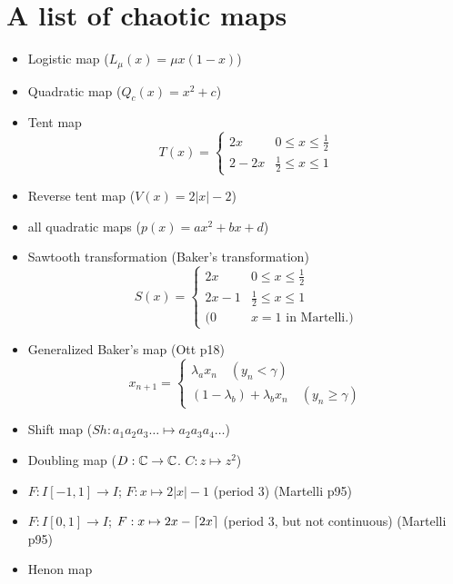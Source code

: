 \documentclass[11pt]{book}
\begin{document}
\section{A list of chaotic maps}
\begin{itemize}
  \item Logistic map ($L_\mu(x) = \mu x(1-x)$)
  \item Quadratic map ($Q_c(x) = x^2 + c$)
  \item Tent map 
    \begin{equation*}
      T(x) = 
      \begin{cases}
        2x & 0 \leq x \leq \frac{1}{2}      \\
        2 - 2x & \frac{1}{2} \leq x \leq 1
      \end{cases}
    \end{equation*}
  \item Reverse tent map ($V(x) = 2|x| - 2$)
  \item all quadratic maps ($p(x) = ax^2 + bx + d$)
  \item Sawtooth transformation (Baker's transformation)
    \begin{equation*}
      S(x) = 
      \begin{cases}
        2x     & 0 \leq x \leq \frac{1}{2}      \\
        2x - 1 & \frac{1}{2} \leq x \leq 1      \\
        (0 & x = 1 \mbox{ in Martelli.})
      \end{cases}
    \end{equation*}
  \item Generalized Baker's map (Ott p18)
    \begin{equation*}
      x_{n+1} = 
      \begin{cases}
        \lambda_a x_n \quad   (y_n < \gamma) \\
        (1 - \lambda_b) + \lambda_b x_n \quad   (y_n \geq \gamma)
      \end{cases}
    \end{equation*}
  \item Shift map ($Sh: a_1a_2a_3\ldots \mapsto a_2a_3a_4\ldots$)
  \item Doubling map ($D: \mathbb{C} \to \mathbb{C}$. $C: z \mapsto z^2$)
  \item $F: I [-1,1] \to I$; $F: x \mapsto 2|x| - 1$ (period 3) (Martelli p95)
  \item $F: I [0,1] \to I$; $F: x \mapsto 2x - \lceil2x\rceil$ (period 3, but not continuous) (Martelli p95)
  \item Henon map

\end{itemize}
\end{document}
